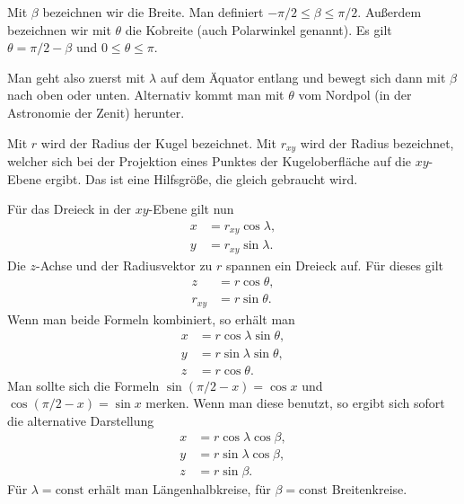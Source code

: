 \documentclass[a4paper,11pt,fleqn,twoside,BCOR=16mm]{scrartcl}
\begin{document}
Mit $\beta$ bezeichnen wir die Breite. Man definiert
$-\pi/2\le\beta\le\pi/2$.
Außerdem bezeichnen wir mit $\theta$ die Kobreite (auch Polarwinkel
genannt). Es gilt $\theta=\pi/2-\beta$ und $0\le\theta\le\pi$.

Man geht also zuerst mit $\lambda$ auf dem Äquator entlang und
bewegt sich dann mit $\beta$ nach oben oder unten. Alternativ
kommt man mit $\theta$ vom Nordpol (in der Astronomie der Zenit)
herunter.

Mit $r$ wird der Radius der Kugel bezeichnet. Mit $r_{xy}$ wird
der Radius bezeichnet, welcher sich bei der Projektion eines Punktes
der Kugeloberfläche auf die $xy$-Ebene ergibt. Das ist eine
Hilfsgröße, die gleich gebraucht wird.

Für das Dreieck in der $xy$-Ebene gilt nun
\begin{equation}
  \begin{split}
  x &= r_{xy}\cos\lambda,\\
  y &= r_{xy}\sin\lambda.
  \end{split}
\end{equation}
Die $z$-Achse und der Radiusvektor zu $r$ spannen ein
Dreieck auf. Für dieses gilt
\begin{equation}
  \begin{split}
  z &= r\cos\theta,\\
  r_{xy} &= r\sin\theta.
  \end{split}
\end{equation}
Wenn man beide Formeln kombiniert, so erhält man
\begin{equation}
  \begin{split}
  x &= r\cos\lambda\sin\theta,\\
  y &= r\sin\lambda\sin\theta,\\
  z &= r\cos\theta.
  \end{split}
\end{equation}
Man sollte sich die Formeln $\sin(\pi/2-x)=\cos x$
und $\cos(\pi/2-x)=\sin x$ merken. Wenn man diese benutzt, so
ergibt sich sofort die alternative Darstellung
\begin{equation}
  \begin{split}
  x &= r\cos\lambda\cos\beta,\\
  y &= r\sin\lambda\cos\beta,\\
  z &= r\sin\beta.
  \end{split}
\end{equation}
Für $\lambda=\mathrm{const}$ erhält man Längenhalbkreise, für
$\beta=\mathrm{const}$ Breitenkreise.
\end{document}
